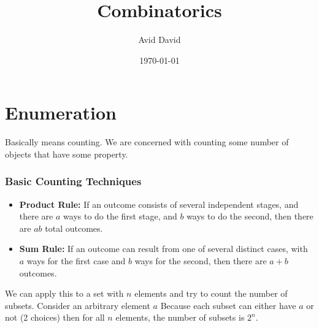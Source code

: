 \documentclass[12pt]{article}
\begin{document}
\title{Combinatorics}
\author{Avid David}
\date{\today}
\maketitle
\tableofcontents
\newpage
\part{Enumeration}
Basically means counting. We are concerned with counting some number of objects that have some property. 
\section{Basic Counting Techniques}
\begin{itemize}
    \item \textbf{Product Rule:} If an outcome consists of several independent stages, and there are $a$ ways to do the first stage, and $b$ ways to do the second, then there are $ab$ total outcomes.
    \item \textbf{Sum Rule:}  If an outcome can result from one of several distinct cases, with $a$ ways for the first case and $b$ ways for the second, then there are $a+b$ outcomes.
\end{itemize}
We can apply this to a set with $n$ elements and try to count the number of subsets. Consider an arbitrary element $a$ Because each subset can either have $a$ or not (2 choices) then for all $n$ elements, the number of subsets is $2^n$.
\end{document}
